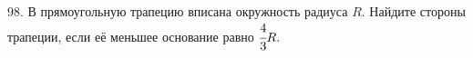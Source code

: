 98. В прямоугольную трапецию вписана окружность радиуса $R.$ Найдите стороны трапеции, если её меньшее основание равно $\cfrac{4}{3}R.$\\
